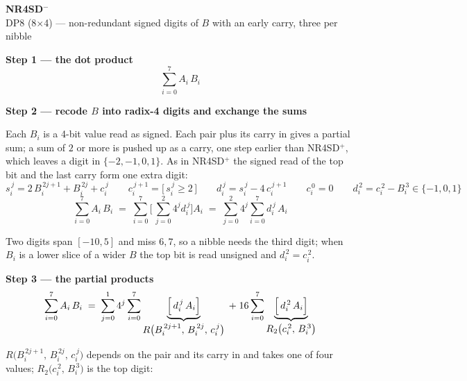 \documentclass[fleqn]{article}
\newcommand{\Rp}{R\bigl(B_i^{\,2j+1},\, B_i^{\,2j},\, c_i^{\,j}\bigr)}
\newcommand{\Rt}{R_2\bigl(c_i^{\,2},\, B_i^{\,3}\bigr)}
\begin{document}
\begin{center}
{\LARGE \textbf{NR4SD$^{-}$}}\\[4pt]
{\large DP8 (8$\times$4) --- non-redundant signed digits of $B$ with an early carry, three per nibble}
\end{center}

\vspace{1.5em}

\noindent\textbf{Step 1 --- the dot product}
\[
\sum_{i=0}^{7} A_i \, B_i
\]

\vspace{0.5em}

\noindent\textbf{Step 2 --- recode $B$ into radix-4 digits and exchange the sums}

\noindent Each $B_i$ is a 4-bit value read as signed. Each pair plus its carry in gives a
partial sum; a sum of $2$ or more is pushed up as a carry, one step earlier than
NR4SD$^{+}$, which leaves a digit in $\{-2, -1, 0, 1\}$. As in NR4SD$^{+}$ the signed
read of the top bit and the last carry form one extra digit:
\[
s_i^{\,j} = 2\,B_i^{\,2j+1} + B_i^{\,2j} + c_i^{\,j}
\qquad
c_i^{\,j+1} = \bigl[\, s_i^{\,j} \geq 2 \,\bigr]
\qquad
d_i^{\,j} = s_i^{\,j} - 4\,c_i^{\,j+1}
\qquad
c_i^{\,0} = 0
\qquad
d_i^{\,2} = c_i^{\,2} - B_i^{\,3} \in \{-1, 0, 1\}
\]
\[
\sum_{i=0}^{7} A_i \, B_i
  \;=\; \sum_{i=0}^{7} \Biggl[\, \sum_{j=0}^{2} 4^{j} d_i^{\,j} \Biggr] A_i
  \;=\; \sum_{j=0}^{2} 4^{j} \sum_{i=0}^{7} d_i^{\,j} \, A_i
\]

\noindent Two digits span $[-10, 5]$ and miss $6, 7$, so a nibble needs the third digit;
when $B_i$ is a lower slice of a wider $B$ the top bit is read unsigned and
$d_i^{\,2} = c_i^{\,2}$.

\vspace{0.5em}

\noindent\textbf{Step 3 --- the partial products}
\[
\sum_{i=0}^{7} A_i \, B_i
  \;=\; \sum_{j=0}^{1} 4^{j} \sum_{i=0}^{7}
        \underbrace{\Bigl[\, d_i^{\,j} \, A_i \Bigr]}_{\textstyle \Rp}
  \;+\; 16 \sum_{i=0}^{7}
        \underbrace{\Bigl[\, d_i^{\,2} \, A_i \Bigr]}_{\textstyle \Rt}
\]

\noindent $\Rp$ depends on the pair and its carry in and takes one of four values;
$\Rt$ is the top digit:

\vspace{0.5em}
\end{document}
